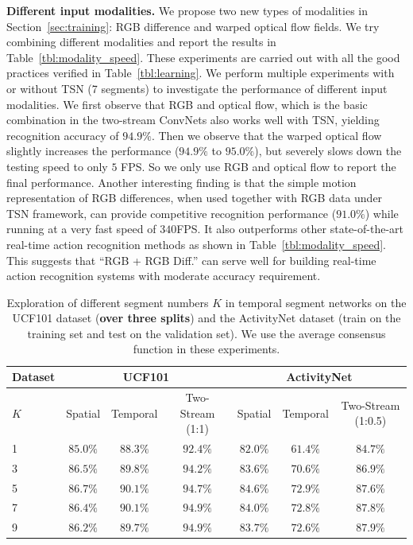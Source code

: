 \documentclass[10pt,journal,compsoc]{IEEEtran}
\newcommand{\SEGNET}{temporal segment network}
\begin{document}
{\bf Different input modalities.} We propose two new types of modalities in Section~\ref{sec:training}: RGB difference and warped optical flow fields. 
We try combining different modalities and report the results in Table~\ref{tbl:modality_speed}. 
These experiments are carried out with all the good practices verified in Table~\ref{tbl:learning}. 
We perform multiple experiments with or without TSN (7 segments) to investigate the performance of different input modalities.
We first observe that RGB and optical flow, which is the basic combination in the two-stream ConvNets also works well with TSN, yielding recognition accuracy of $ 94.9\% $. Then we observe that the warped optical flow  slightly increases the performance ($94.9\%$ to $95.0\%$), but severely slows down the testing speed to only $ 5 $ FPS. So we only use RGB and optical flow to report the final performance.
Another interesting finding is that the simple motion representation of RGB differences, when used together with RGB data under TSN framework, can provide competitive recognition performance ($ 91.0\% $) while running at a very fast speed of $ 340 $FPS. 
It also outperforms other state-of-the-art real-time action recognition methods as shown in Table~\ref{tbl:modality_speed}.
This suggests that ``RGB + RGB Diff.'' can serve well for building real-time action recognition systems with moderate accuracy requirement.


\begin{table}[t]
  \begin{center}
    \caption{Exploration of different segment numbers $ K $ in \SEGNET s on the UCF101 dataset ({\bf over three splits}) and the ActivityNet dataset (train on the training set and test on the validation set). We use the average consensus function in these experiments.}
    \label{tbl:seg_num}
    \vspace{-10pt}
    \begin{tabular}{|l|ccc|ccc|}
      \hline
      Dataset & \multicolumn{3}{|c|}{UCF101} & \multicolumn{3}{|c|}{ActivityNet} \\
      \hline
      $ K $ & Spatial  & Temporal & Two-Stream (1:1) & Spatial  & Temporal & Two-Stream (1:0.5) \\
      \hline
      1 & $ 85.0\%  $& $ 88.3\%$ & $ 92.4\% $ &  $ 82.0\% $ & $ 61.4\% $ & $ 84.7\% $ \\
      \hline 
      3 & $ 86.5\%  $& $ 89.8\% $ & $ 94.2\% $   & $ 83.6\% $ & $ 70.6\% $ & $ 86.9\% $ \\
      \hline
      5  &  $ 86.7\% $ &  $ 90.1\% $ & $ 94.7\% $  & $ 84.6\% $ &$ 72.9\% $ & $ 87.6\% $ \\
      \hline
      7 & $ 86.4\% $ & $  90.1\% $ & $ \mathbf{94.9\%} $  & $ 84.0\% $ &$ 72.8\% $ & $ 87.8\% $  \\
      \hline
      9 & $ 86.2\% $ & $  89.7\% $ & $ \mathbf{94.9\%} $    & $ 83.7\% $& $ 72.6\% $& $ \mathbf{87.9\%} $\\
      \hline
    \end{tabular}
  \end{center}
  \vspace{-15pt}
\end{table}
\end{document}

